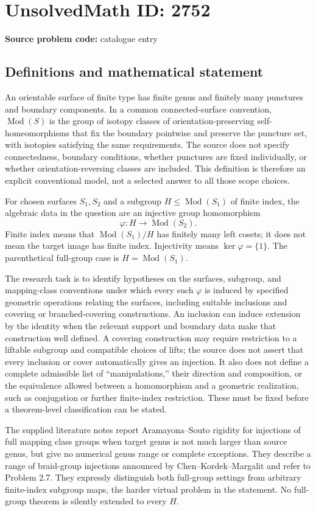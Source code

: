 \documentclass[11pt]{article}
\begin{document}
\section*{UnsolvedMath ID: 2752}
\textbf{Source problem code:} catalogue entry
\subsection{Definitions and mathematical statement}
An orientable surface of finite type has finite genus and finitely many punctures and boundary components. In a common connected-surface convention, $\operatorname{Mod}(S)$ is the group of isotopy classes of orientation-preserving self-homeomorphisms that fix the boundary pointwise and preserve the puncture set, with isotopies satisfying the same requirements. The source does not specify connectedness, boundary conditions, whether punctures are fixed individually, or whether orientation-reversing classes are included. This definition is therefore an explicit conventional model, not a selected answer to all those scope choices.

For chosen surfaces $S_1,S_2$ and a subgroup $H\leq\operatorname{Mod}(S_1)$ of finite index, the algebraic data in the question are an injective group homomorphism
\[
\varphi:H\longrightarrow\operatorname{Mod}(S_2).
\]
Finite index means that $\operatorname{Mod}(S_1)/H$ has finitely many left cosets; it does not mean the target image has finite index. Injectivity means $\ker\varphi=\{1\}$. The parenthetical full-group case is $H=\operatorname{Mod}(S_1)$.

The research task is to identify hypotheses on the surfaces, subgroup, and mapping-class conventions under which every such $\varphi$ is induced by specified geometric operations relating the surfaces, including suitable inclusions and covering or branched-covering constructions. An inclusion can induce extension by the identity when the relevant support and boundary data make that construction well defined. A covering construction may require restriction to a liftable subgroup and compatible choices of lifts; the source does not assert that every inclusion or cover automatically gives an injection. It also does not define a complete admissible list of ``manipulations,'' their direction and composition, or the equivalence allowed between a homomorphism and a geometric realization, such as conjugation or further finite-index restriction. These must be fixed before a theorem-level classification can be stated.

The supplied literature notes report Aramayona--Souto rigidity for injections of full mapping class groups when target genus is not much larger than source genus, but give no numerical genus range or complete exceptions. They describe a range of braid-group injections announced by Chen--Kordek--Margalit and refer to Problem 2.7. They expressly distinguish both full-group settings from arbitrary finite-index subgroup maps, the harder virtual problem in the statement. No full-group theorem is silently extended to every $H$.
\end{document}
